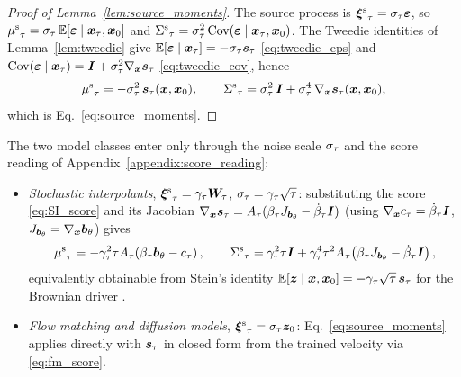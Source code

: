 \begin{proof}[Proof of Lemma~\ref{lem:source_moments}]
The source process is ${\bm{\xi}^{\mathrm{s}}}_\tau = \sigma_\tau\bm{\varepsilon}$, so ${\mu^{\mathrm{s}}}_\tau = \sigma_\tau\,\mathbb{E}[\bm{\varepsilon}\mid\boldsymbol{x}_\tau,\boldsymbol{x}_0]$ and ${\Sigma^{\mathrm{s}}}_\tau = \sigma_\tau^2\,\text{Cov}(\bm{\varepsilon}\mid\boldsymbol{x}_\tau,\boldsymbol{x}_0)$. The Tweedie identities of Lemma~\ref{lem:tweedie} give $\mathbb{E}[\bm{\varepsilon}\mid\boldsymbol{x}_\tau]=-\sigma_\tau\bm{s}_\tau$ \eqref{eq:tweedie_eps} and $\text{Cov}(\bm{\varepsilon}\mid\boldsymbol{x}_\tau)=\bm{I}+\sigma_\tau^2\nabla_{\boldsymbol{x}}\bm{s}_\tau$ \eqref{eq:tweedie_cov}, hence
\begin{align}
    {\mu^{\mathrm{s}}}_\tau = -\sigma_\tau^2\,\bm{s}_\tau(\boldsymbol{x},\boldsymbol{x}_0),
    \qquad
    {\Sigma^{\mathrm{s}}}_\tau = \sigma_\tau^2\,\bm{I} + \sigma_\tau^4\,\nabla_{\boldsymbol{x}}\bm{s}_\tau(\boldsymbol{x},\boldsymbol{x}_0),
\end{align}
which is Eq.~\eqref{eq:source_moments}.
\end{proof}

\begin{remark}\label{rem:source_moments_instantiation}
The two model classes enter only through the noise scale $\sigma_\tau$ and the score reading of Appendix~\ref{appendix:score_reading}:
\begin{itemize}
    \item \emph{Stochastic interpolants}, ${\bm{\xi}^{\mathrm{s}}}_\tau=\gamma_\tau\boldsymbol{W}_\tau$, $\sigma_\tau=\gamma_\tau\sqrt\tau$: substituting the score \eqref{eq:SI_score} and its Jacobian $\nabla_{\boldsymbol{x}}\bm{s}_\tau = A_\tau(\beta_\tau J_{\bm{b}_\theta} - \dot\beta_\tau\bm{I})$ (using $\nabla_{\boldsymbol{x}}c_\tau=\dot\beta_\tau\bm{I}$, $J_{\bm{b}_\theta}=\nabla_{\boldsymbol{x}}\bm{b}_\theta$) gives
    \begin{align}
        {\mu^{\mathrm{s}}}_\tau = -\gamma_\tau^2\tau A_\tau\!\left(\beta_\tau\bm{b}_\theta - c_\tau\right),
        \qquad
        {\Sigma^{\mathrm{s}}}_\tau = \gamma_\tau^2\tau\bm{I} + \gamma_\tau^4\tau^2 A_\tau\!\left(\beta_\tau J_{\bm{b}_\theta} - \dot\beta_\tau\bm{I}\right),
    \end{align}
    equivalently obtainable from Stein's identity $\mathbb{E}[\boldsymbol{z}\mid\boldsymbol{x},\boldsymbol{x}_0]=-\gamma_\tau\sqrt\tau\,\bm{s}_\tau$ for the Brownian driver \cite{albergo_stochastic_2023, chen_probabilistic_2024}.
    \item \emph{Flow matching and diffusion models}, ${\bm{\xi}^{\mathrm{s}}}_\tau=\sigma_\tau\bm{z}_0$: Eq.~\eqref{eq:source_moments} applies directly with $\bm{s}_\tau$ in closed form from the trained velocity via \eqref{eq:fm_score}.
\end{itemize}
\end{remark}

